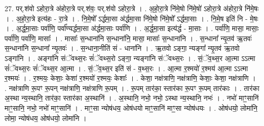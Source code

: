 \documentclass[17pt]{extarticle}
\begin{document}
27. पर्.श॑वो ऽहोरा॒त्रे अ॑होरा॒त्रे पर्.श॑वः॒ पर्.श॑वो ऽहोरा॒त्रे । . अ॒हो॒रा॒त्रे नि॑मे॒षो नि॑मे॒षो॑ ऽहोरा॒त्रे अ॑होरा॒त्रे नि॑मे॒षः । . अ॒हो॒रा॒त्रे इत्य॑हः - रा॒त्रे । . नि॒मे॒षो᳚ ऽर्द्धमा॒सा अ॑र्द्धमा॒सा नि॑मे॒षो नि॑मे॒षो᳚ ऽर्द्धमा॒साः । . नि॒मे॒ष इति॑ नि - मे॒षः । . अ॒र्द्ध॒मा॒साः पर्वा॑णि॒ पर्वा᳚ण्यर्द्धमा॒सा अ॑र्द्धमा॒साः पर्वा॑णि । . अ॒र्द्ध॒मा॒सा इत्य॑र्द्ध - मा॒साः । . पर्वा॑णि॒ मासा॒ मासाः॒ पर्वा॑णि॒ पर्वा॑णि॒ मासाः᳚ । . मासाः᳚ स॒न्धाना॑नि स॒न्धाना॑नि॒ मासा॒ मासाः᳚ स॒न्धाना॑नि । . स॒न्धाना᳚ न्यृ॒तव॑ ऋ॒तवः॑ स॒न्धाना॑नि स॒न्धाना᳚ न्यृ॒तवः॑ । . स॒न्धाना॒नीति॑ सं - धाना॑नि । . ऋ॒तवो ऽङ्गा॒ न्यङ्गा᳚ न्यृ॒तव॑ ऋ॒तवो ऽङ्गा॑नि । . अङ्गा॑नि संॅवथ्स॒रः सं॑ॅवथ्स॒रो ऽङ्गा॒ न्यङ्गा॑नि संॅवथ्स॒रः । . सं॒ॅव॒थ्स॒र आ॒त्मा ऽऽत्मा सं॑ॅवथ्स॒रः सं॑ॅवथ्स॒र आ॒त्मा । . सं॒ॅव॒थ्स॒र इति॑ सं - व॒थ्स॒रः । . आ॒त्मा र॒श्मयो॑ र॒श्मय॑ आ॒त्मा ऽऽत्मा र॒श्मयः॑ । . र॒श्मयः॒ केशाः॒ केशा॑ र॒श्मयो॑ र॒श्मयः॒ केशाः᳚ । . केशा॒ नक्ष॑त्राणि॒ नक्ष॑त्राणि॒ केशाः॒ केशा॒ नक्ष॑त्राणि । . नक्ष॑त्राणि रू॒पꣳ रू॒पन् नक्ष॑त्राणि॒ नक्ष॑त्राणि रू॒पम् । . रू॒पम् तार॑का॒ स्तार॑का रू॒पꣳ रू॒पम् तार॑काः । . तार॑का अ॒स्था न्य॒स्थानि॒ तार॑का॒ स्तार॑का अ॒स्थानि॑ । . अ॒स्थानि॒ नभो॒ नभो॒ ऽस्था न्य॒स्थानि॒ नभः॑ । . नभो॑ माꣳ॒॒सानि॑ माꣳ॒॒सानि॒ नभो॒ नभो॑ माꣳ॒॒सानि॑ । . माꣳ॒॒सा न्योष॑धय॒ ओष॑धयो माꣳ॒॒सानि॑ माꣳ॒॒सा न्योष॑धयः । . ओष॑धयो॒ लोमा॑नि॒ लोमा॒ न्योष॑धय॒ ओष॑धयो॒ लोमा॑नि । \newline
\end{document}
